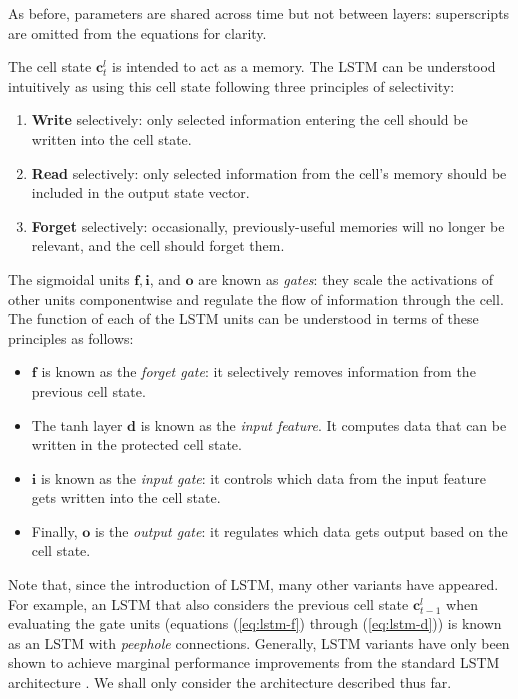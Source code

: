 \documentclass[12pt,a4paper,twoside,openright]{report}
\newcommand{\vect}[1]{\boldsymbol{\mathbf{#1}}}
\begin{document}
As before, parameters are shared across time but not between layers:
superscripts are omitted from the equations for clarity.

The cell state $\vect{c}_t^l$ is intended to act as a memory. The LSTM can be
understood intuitively as using this cell state following three principles of
selectivity:
\begin{enumerate}[label=\arabic*., itemsep=0mm]
  \item \textbf{Write} selectively: only selected information entering the cell
    should be written into the cell state.
  \item \textbf{Read} selectively: only selected information from the cell's
    memory should be included in the output state vector.
  \item \textbf{Forget} selectively: occasionally, previously-useful memories
    will no longer be relevant, and the cell should forget them.
\end{enumerate}

The sigmoidal units $\vect{f}, \vect{i}$, and $\vect{o}$ are known as
\emph{gates}: they scale the activations of other units componentwise and
regulate the flow of information through the cell. The function of each of the
LSTM units can be understood in terms of these principles as follows:

\begin{itemize}
  \item $\vect{f}$ is known as the \emph{forget gate}: it selectively removes
    information from the previous cell state.
  \item The tanh layer $\vect{d}$ is known as the \emph{input feature}. It
    computes data that can be written in the protected cell state.
\item $\vect{i}$ is known as the \emph{input gate}: it controls which data from
  the input feature gets written into the cell state.
\item Finally, $\vect{o}$ is the \emph{output gate}: it regulates which data
  gets output based on the cell state.
\end{itemize}

Note that, since the introduction of LSTM, many other variants have appeared.
For example, an LSTM that also considers the previous cell state
$\vect{c}_{t-1}^l$ when evaluating the gate units (equations (\ref{eq:lstm-f})
through (\ref{eq:lstm-d})) is known as an LSTM with \emph{peephole} connections.
Generally, LSTM variants have only been shown to achieve marginal performance
improvements from the standard LSTM architecture \cite{greff2016lstm}. We shall
only consider the architecture described thus far.
\end{document}

